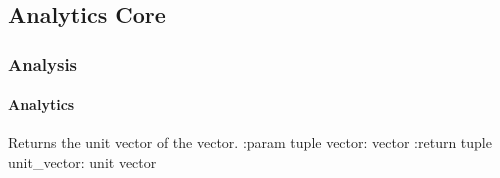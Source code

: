 \documentclass[letterpaper,10pt,english]{sphinxmanual}
\begin{document}
\subsection{Analytics Core}
\label{\detokenize{_autosummary/analytics_core:analytics-core}}\label{\detokenize{_autosummary/analytics_core::doc}}

\subsubsection{Analysis}
\label{\detokenize{_autosummary/analytics_core.analytics:analysis}}\label{\detokenize{_autosummary/analytics_core.analytics::doc}}

\paragraph{Analytics}
\label{\detokenize{_autosummary/analytics_core.analytics:module-analytics_core.analytics.analytics}}\label{\detokenize{_autosummary/analytics_core.analytics:analytics}}

\begin{fulllineitems}
\label{\detokenize{_autosummary/analytics_core.analytics:analytics_core.analytics.analytics.unit_vector}}
Returns the unit vector of the vector.
:param tuple vector: vector
:return tuple unit\_vector: unit vector

\end{fulllineitems}

\end{document}
